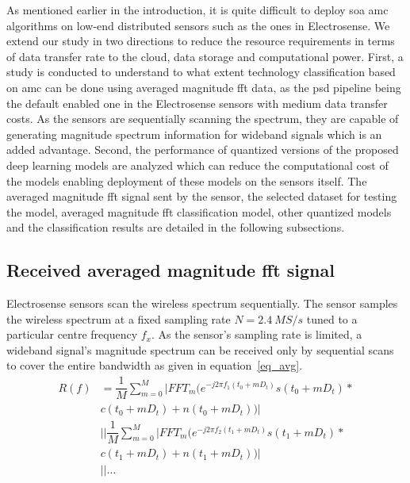 As mentioned earlier in the introduction, it is quite difficult to deploy \ac{soa} \ac{amc} algorithms on low-end distributed sensors such as the ones in Electrosense. We extend our study in two directions to reduce the resource requirements in terms of data transfer rate to the cloud, data storage and computational power. First, a study is conducted to understand to what extent technology classification based on \ac{amc} can be done using averaged magnitude \ac{fft} data, as the \ac{psd} pipeline being the default enabled one in the Electrosense sensors with medium data transfer costs. As the sensors are sequentially scanning the spectrum, they are capable of generating magnitude spectrum information for wideband signals which is an added advantage. Second, the performance of quantized versions of the proposed deep learning models are analyzed which can reduce the computational cost of the models enabling deployment of these models on the sensors itself. The averaged magnitude \ac{fft} signal sent by the sensor, the selected dataset for testing the model, averaged magnitude \ac{fft} classification model, other quantized models and the classification results are detailed in the following subsections.

\subsection{Received averaged magnitude \ac{fft} signal}
Electrosense sensors scan the wireless spectrum sequentially. The sensor samples the wireless spectrum at a fixed sampling rate $N = 2.4~MS/s$ tuned to a particular centre frequency $f_x$.  As the sensor's sampling rate is limited, a wideband signal's magnitude spectrum can be received only by sequential scans to cover the entire bandwidth as given in equation~\ref{eq_avg}.
\begin{equation}
\begin{split}
R(f)&=\dfrac{1}{M}\sum_{m=0}^{M}|FFT_m(e^{-j2\pi f_1(t_0+mD_t)}s(t_0+mD_t)*\\ &c(t_0+mD_t)+n(t_0+mD_t))|\\ 
&||\dfrac{1}{M}\sum_{m=0}^{M}|FFT_m(e^{-j2\pi f_2(t_1+mD_t)}s(t_1+mD_t)*\\
&c(t_1+mD_t)+n(t_1+mD_t))|\\
&||\ldots
\end{split}
\label{eq_avg}
\end{equation}

